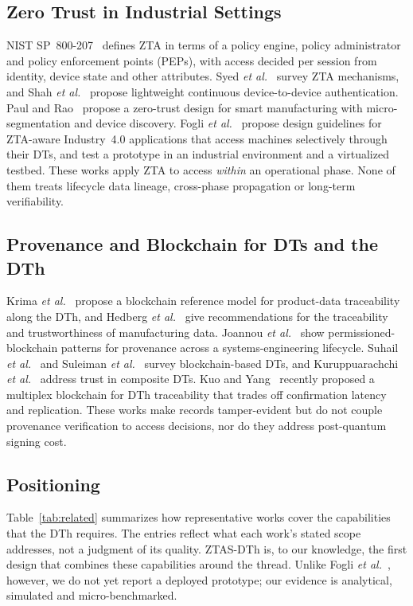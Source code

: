 \documentclass[journal]{IEEEtran}
\newcommand{\ztas}{ZTAS-DTh}
\begin{document}
\subsection{Zero Trust in Industrial Settings}
NIST SP~800-207~\cite{rose2020zta} defines ZTA in terms of a policy engine, policy administrator and policy enforcement points (PEPs), with access decided per session from identity, device state and other attributes. Syed \emph{et al.}~\cite{syed2022zta} survey ZTA mechanisms, and Shah \emph{et al.}~\cite{shah2021lcda} propose lightweight continuous device-to-device authentication. Paul and Rao~\cite{paul2023zt} propose a zero-trust design for smart manufacturing with micro-segmentation and device discovery. Fogli \emph{et al.}~\cite{fogli2025zta} propose design guidelines for ZTA-aware Industry~4.0 applications that access machines selectively through their DTs, and test a prototype in an industrial environment and a virtualized testbed. These works apply ZTA to access \emph{within} an operational phase. None of them treats lifecycle data lineage, cross-phase propagation or long-term verifiability.

\subsection{Provenance and Blockchain for DTs and the DTh}
Krima \emph{et al.}~\cite{krima2019dth} propose a blockchain reference model for product-data traceability along the DTh, and Hedberg \emph{et al.}~\cite{hedberg2020trace} give recommendations for the traceability and trustworthiness of manufacturing data. Joannou \emph{et al.}~\cite{joannou2020perm} show permissioned-blockchain patterns for provenance across a systems-engineering lifecycle. Suhail \emph{et al.}~\cite{suhail2022bdt} and Suleiman \emph{et al.}~\cite{suleiman2025bdt} survey blockchain-based DTs, and Kuruppuarachchi \emph{et al.}~\cite{kuruppuarachchi2022comp} address trust in composite DTs. Kuo and Yang~\cite{kuo2026multiplex} recently proposed a multiplex blockchain for DTh traceability that trades off confirmation latency and replication. These works make records tamper-evident but do not couple provenance verification to access decisions, nor do they address post-quantum signing cost.

\subsection{Positioning}
Table~\ref{tab:related} summarizes how representative works cover the capabilities that the DTh requires. The entries reflect what each work's stated scope addresses, not a judgment of its quality. \ztas{} is, to our knowledge, the first design that combines these capabilities around the thread. Unlike Fogli \emph{et al.}~\cite{fogli2025zta}, however, we do not yet report a deployed prototype; our evidence is analytical, simulated and micro-benchmarked.
\end{document}
